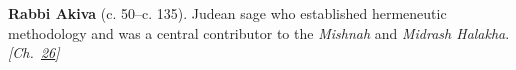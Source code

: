 \textbf{Rabbi Akiva} (c. 50–c. 135). Judean sage who established hermeneutic methodology and was a central contributor to the \emph{Mishnah} and \emph{Midrash Halakha}. \emph{[Ch.~\hyperref[ch:jewishcalendar]{26}]}


